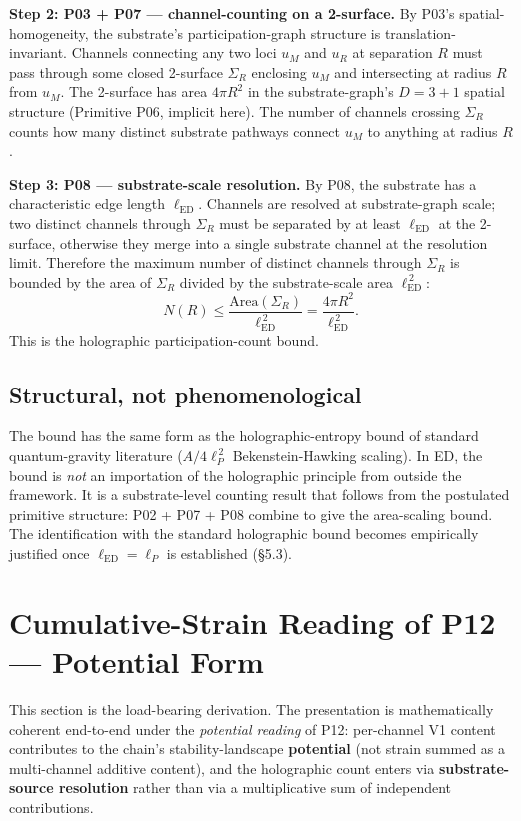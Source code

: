 \documentclass[11pt,a4paper]{article}
\begin{document}
\textbf{Step 2: P03 + P07 --- channel-counting on a 2-surface.} By P03's spatial-homogeneity, the substrate's participation-graph structure is translation-invariant. Channels connecting any two loci $u_M$ and $u_R$ at separation $R$ must pass through some closed 2-surface $\Sigma_R$ enclosing $u_M$ and intersecting at radius $R$ from $u_M$. The 2-surface has area $4\pi R^2$ in the substrate-graph's $D=3+1$ spatial structure (Primitive P06, implicit here). The number of channels crossing $\Sigma_R$ counts how many distinct substrate pathways connect $u_M$ to anything at radius $R$.

\textbf{Step 3: P08 --- substrate-scale resolution.} By P08, the substrate has a characteristic edge length $\ell_\mathrm{ED}$. Channels are resolved at substrate-graph scale; two distinct channels through $\Sigma_R$ must be separated by at least $\ell_\mathrm{ED}$ at the 2-surface, otherwise they merge into a single substrate channel at the resolution limit. Therefore the maximum number of distinct channels through $\Sigma_R$ is bounded by the area of $\Sigma_R$ divided by the substrate-scale area $\ell_\mathrm{ED}^{\,2}$:
\[
N(R) \leq \frac{\mathrm{Area}(\Sigma_R)}{\ell_\mathrm{ED}^{\,2}} = \frac{4\pi R^2}{\ell_\mathrm{ED}^{\,2}}.
\]
This is the holographic participation-count bound.

\subsection{Structural, not phenomenological}

The bound has the same form as the holographic-entropy bound of standard quantum-gravity literature ($A/4\ell_P^{\,2}$ Bekenstein-Hawking scaling). In ED, the bound is \emph{not} an importation of the holographic principle from outside the framework. It is a substrate-level counting result that follows from the postulated primitive structure: P02 + P07 + P08 combine to give the area-scaling bound. The identification with the standard holographic bound becomes empirically justified once $\ell_\mathrm{ED} = \ell_P$ is established (\S5.3).

\section{Cumulative-Strain Reading of P12 --- Potential Form}

This section is the load-bearing derivation. The presentation is mathematically coherent end-to-end under the \emph{potential reading} of P12: per-channel V1 content contributes to the chain's stability-landscape \textbf{potential} (not strain summed as a multi-channel additive content), and the holographic count enters via \textbf{substrate-source resolution} rather than via a multiplicative sum of independent contributions.
\end{document}
